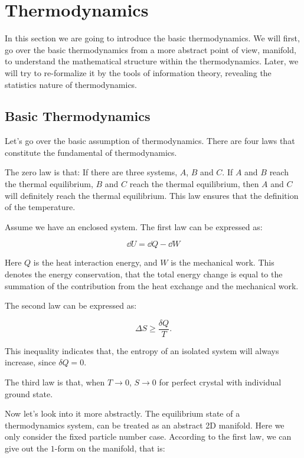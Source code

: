 \documentclass[../main.tex]{subfiles}
\begin{document}
\section{\textbf{Thermodynamics}}

In this section we are going to introduce the basic thermodynamics. We will first, go over the basic thermodynamics from a more abstract point of view, manifold, to understand the mathematical structure within the thermodynamics. Later, we will try to re-formalize it by the tools of information theory, revealing the statistics nature of thermodynamics. 

\subsection{Basic Thermodynamics}

Let's go over the basic assumption of thermodynamics. There are four laws that constitute the fundamental of thermodynamics. 

The zero law is that: If there are three systems, $A$, $B$ and $C$. If $A$ and $B$ reach the thermal equilibrium, $B$ and $C$ reach the thermal equilibrium, then $A$ and $C$ will definitely reach the thermal equilibrium. This law ensures that the definition of the temperature.

Assume we have an enclosed system. The first law can be expressed as:

\begin{equation}
    \dd{U} = \dd{Q} - \dd{W}
\end{equation}

Here $Q$ is the heat interaction energy, and $W$ is the mechanical work. This denotes the energy conservation, that the total energy change is equal to the summation of the contribution from the heat exchange and the mechanical work.

The second law can be expressed as:

\begin{equation}
    \Delta S \ge \frac{\delta Q}{T}.
\end{equation}

This inequality indicates that, the entropy of an isolated system will always increase, since $\delta Q = 0$.

The third law is that, when $T \to 0$, $S \to 0$ for perfect crystal with individual ground state.

Now let's look into it more abstractly. The equilibrium state of a thermodynamics system, can be treated as an abstract 2D manifold. Here we only consider the fixed particle number case. According to the first law, we can give out the $1$-form on the manifold, that is:
\end{document}
